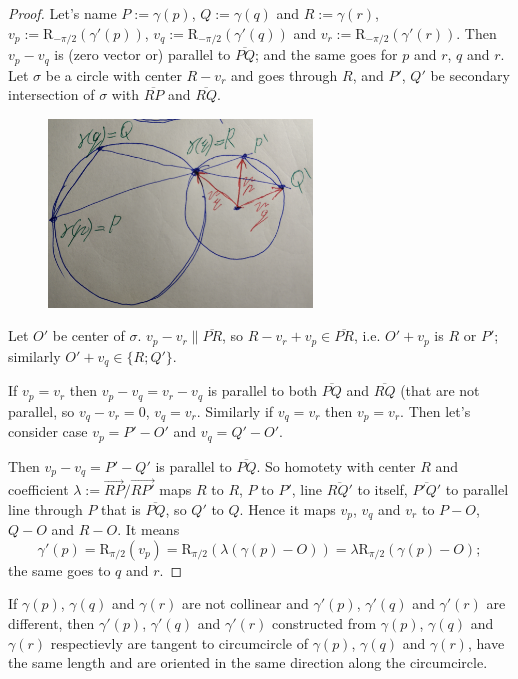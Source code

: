 \documentclass[12pt,a4paper]{article}
\newcommand{\R}{\mathrm{R}}
\begin{document}
\begin{problem}{60}
        \begin{proof}
            Let's name $P := \gamma(p)$, $Q := \gamma(q)$ and $R := \gamma(r)$, $v_p := \R_{-\pi/2}(\gamma'(p))$, $v_q := \R_{-\pi/2}(\gamma'(q))$ and $v_r := \R_{-\pi/2}(\gamma'(r))$. Then $v_p - v_q$ is (zero vector or) parallel to $\overline{PQ}$; and the same goes for $p$ and $r$, $q$ and $r$. Let $\sigma$ be a circle with center $R - v_r$ and goes through $R$, and $P'$, $Q'$ be secondary intersection of $\sigma$ with $\overline{RP}$ and $\overline{RQ}$.
            \begin{figure}[H]
                \centering
                \includegraphics[height=5cm]{DG-HW-006-1.jpg}
            \end{figure}
            Let $O'$ be center of $\sigma$. $v_p - v_r \parallel \overline{PR}$, so $R - v_r + v_p \in \overline{PR}$, i.e. $O' + v_p$ is $R$ or $P'$; similarly $O' + v_q \in \{R; Q'\}$.
            
            If $v_p = v_r$ then $v_p - v_q = v_r - v_q$ is parallel to both $\overline{PQ}$ and $\overline{RQ}$ (that are not parallel, so $v_q - v_r = 0$, $v_q = v_r$. Similarly if $v_q = v_r$ then $v_p = v_r$. Then let's consider case $v_p = P' - O'$ and $v_q = Q' - O'$.

            Then $v_p - v_q = P' - Q'$ is parallel to $\overline{PQ}$. So homotety with center $R$ and coefficient $\lambda := \overrightarrow{RP}/\overrightarrow{RP'}$ maps $R$ to $R$, $P$ to $P'$, line $\overline{RQ'}$ to itself, $\overline{P'Q'}$ to parallel line through $P$ that is $\overline{PQ}$, so $Q'$ to $Q$. Hence it maps $v_p$, $v_q$ and $v_r$ to $P - O$, $Q - O$ and $R - O$. It means
            \[\gamma'(p) = \R_{\pi/2}(v_p) = \R_{\pi/2}(\lambda(\gamma(p) - O)) = \lambda \R_{\pi/2}(\gamma(p) - O);\]
            the same goes to $q$ and $r$.
        \end{proof}

        \begin{corollary}
            If $\gamma(p)$, $\gamma(q)$ and $\gamma(r)$ are not collinear and $\gamma'(p)$, $\gamma'(q)$ and $\gamma'(r)$ are different, then $\gamma'(p)$, $\gamma'(q)$ and $\gamma'(r)$ constructed from $\gamma(p)$, $\gamma(q)$ and $\gamma(r)$ respectievly are tangent to circumcircle of $\gamma(p)$, $\gamma(q)$ and $\gamma(r)$, have the same length and are oriented in the same direction along the circumcircle.
        \end{corollary}


\end{problem}
\end{document}
